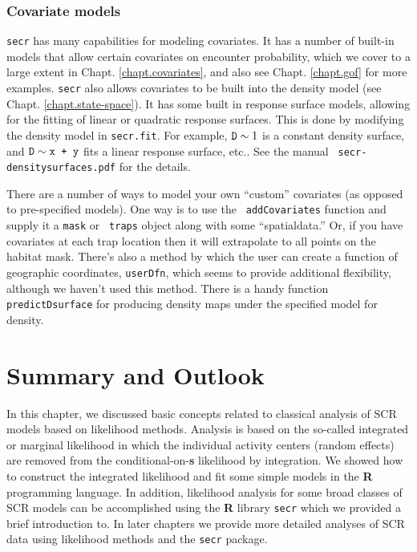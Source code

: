 \subsubsection{Covariate models}
\mbox{\tt secr} has many capabilities for modeling 
covariates. It has a number of built-in models that allow certain
covariates on encounter probability, which we cover to a large
extent in
 Chapt. \ref{chapt.covariates}, and also see
Chapt. \ref{chapt.gof} for more examples. 
%
\mbox{\tt secr} also allows covariates to be built into the density
model (see Chapt. \ref{chapt.state-space}).  It has some built in
response surface models, allowing for the fitting of linear or
quadratic response surfaces. This is done by modifying the density
model in \mbox{\tt secr.fit}. For example, $\mbox{\tt D} \sim 1$ is a
constant density surface, and $\mbox{\tt D} \sim \mbox{\tt x + y}$
fits a linear response surface, etc..  See the manual \mbox{\tt
  secr-densitysurfaces.pdf} for the details.

There are a number of ways to model your own ``custom'' covariates (as
opposed to pre-specified models).  One way is to use the \mbox{\tt
  addCovariates} function and supply it a \mbox{\tt mask} or \mbox{\tt
  traps} object along with some ``spatialdata.''  Or, if you have
covariates at each trap location then it will extrapolate to all
points on the habitat mask.  There's also a method by which the user
can create a function of geographic coordinates, \mbox{\tt userDfn},
which seems to provide additional flexibility, although we haven't
used this method.  There is a handy function \mbox{\tt
  predictDsurface} for producing density maps under the specified
model for density.




\section{Summary and Outlook}

In this chapter, we discussed basic concepts related to classical
analysis of SCR models based on likelihood methods. Analysis is based
on the so-called integrated or marginal likelihood in which the
individual activity centers (random effects) are removed from the
conditional-on-{\bf s} likelihood by integration. We showed how to
construct the integrated likelihood and fit some simple models in the
{\bf R} programming language.  In addition, likelihood analysis for
some broad classes of SCR models can be accomplished using the {\bf R}
library \mbox{\tt secr} \citep{efford:2011} which we provided a brief
introduction to. In later chapters we provide more detailed analyses
of SCR data using likelihood methods and the \mbox{\tt secr} package.

